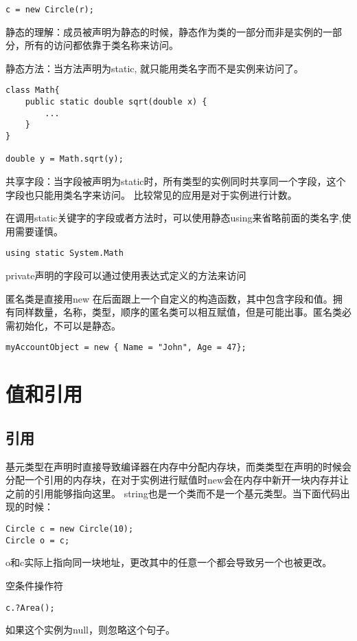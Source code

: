 \documentclass[10pt, a4paper]{article}
\begin{document}
\begin{lstlisting}
c = new Circle(r);
\end{lstlisting}

        静态的理解：成员被声明为静态的时候，静态作为类的一部分而非是实例的一部分，所有的访问都依靠于类名称来访问。

        静态方法：当方法声明为static, 就只能用类名字而不是实例来访问了。 
\begin{lstlisting}
class Math{
    public static double sqrt(double x) {
        ...
    }
}

double y = Math.sqrt(y); 
\end{lstlisting}

        共享字段：当字段被声明为static时，所有类型的实例同时共享同一个字段，这个字段也只能用类名字来访问。 比较常见的应用是对于实例进行计数。

        在调用static关键字的字段或者方法时，可以使用静态using来省略前面的类名字,使用需要谨慎。
\begin{lstlisting}
using static System.Math
\end{lstlisting}
        
        private声明的字段可以通过使用表达式定义的方法来访问
        
        匿名类是直接用new 在后面跟上一个自定义的构造函数，其中包含字段和值。拥有同样数量，名称，类型，顺序的匿名类可以相互赋值，但是可能出事。匿名类必需初始化，不可以是静态。
\begin{lstlisting}
myAccountObject = new { Name = "John", Age = 47};
\end{lstlisting}

    \section{值和引用}
        \subsection{引用}
        基元类型在声明时直接导致编译器在内存中分配内存块，而类类型在声明的时候会分配一个引用的内存块，在对于实例进行赋值时new会在内存中新开一块内存并让之前的引用能够指向这里。 string也是一个类而不是一个基元类型。当下面代码出现的时候：
\begin{lstlisting}
Circle c = new Circle(10); 
Circle o = c; 
\end{lstlisting}

        o和c实际上指向同一块地址，更改其中的任意一个都会导致另一个也被更改。

        空条件操作符
\begin{lstlisting}
c.?Area(); 
\end{lstlisting}
        如果这个实例为null，则忽略这个句子。
\end{document}
